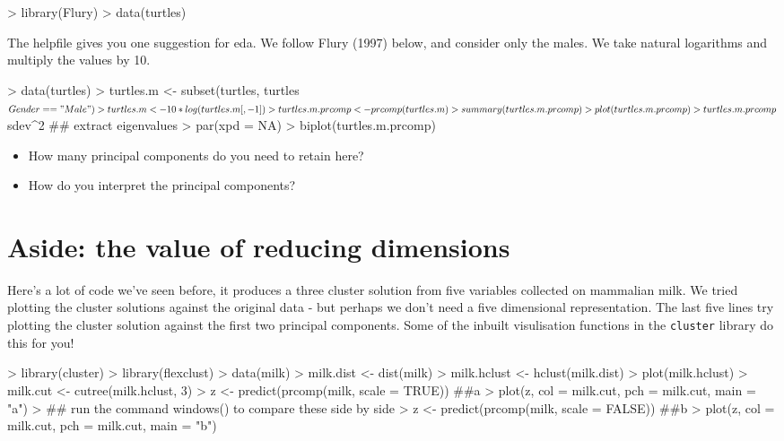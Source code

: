 \documentclass[11pt]{article}
\begin{document}
\begin{Schunk}
\begin{Sinput}
> library(Flury)
> data(turtles)
\end{Sinput}
\end{Schunk}

The helpfile gives you one suggestion for eda.   We follow Flury (1997) below, and consider only the males.   We take natural logarithms and multiply the values by 10.

\begin{Schunk}
\begin{Sinput}
> data(turtles)
>   turtles.m <- subset(turtles, turtles$Gender == "Male")
>   turtles.m <- 10 * log(turtles.m[,-1])
>   turtles.m.prcomp <- prcomp(turtles.m)
>   summary(turtles.m.prcomp)
> plot(turtles.m.prcomp)
> turtles.m.prcomp$sdev^2 ## extract eigenvalues
> par(xpd = NA)
> biplot(turtles.m.prcomp)
\end{Sinput}
\end{Schunk}

\begin{itemize}
\item How many principal components do you need to retain here?
\item How do you interpret the principal components?
\end{itemize}


\section{Aside: the value of reducing dimensions}

Here's a lot of code we've seen before, it produces a three cluster solution from five variables collected on mammalian milk.   We tried plotting the cluster solutions against the original data - but perhaps we don't need a five dimensional representation.   The last five lines try plotting the cluster solution against the first two principal components.   Some of the inbuilt visulisation functions in the \texttt{cluster} library do this for you!

\begin{Schunk}
\begin{Sinput}
> library(cluster)
> library(flexclust)
> data(milk)
> milk.dist <- dist(milk)
> milk.hclust <- hclust(milk.dist)
> plot(milk.hclust)
> milk.cut <- cutree(milk.hclust, 3)
> z <- predict(prcomp(milk, scale = TRUE)) ##a
> plot(z, col = milk.cut, pch = milk.cut, main = "a")
> ## run the command windows() to compare these side by side
> z <- predict(prcomp(milk, scale = FALSE)) ##b
> plot(z, col = milk.cut, pch = milk.cut, main = "b")
\end{Sinput}
\end{Schunk}
\end{document}
